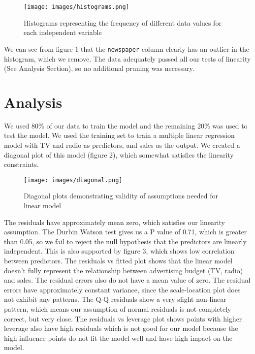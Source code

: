 \documentclass{article}
\begin{document}
\begin{figure}[h]
    \centering
    \texttt{[image: images/histograms.png]}
    \caption{Histograms representing the frequency of different data values for each independent variable}
    \label{fig:enter-label}
\end{figure}

We can see from figure $1$ that the \texttt{newspaper} column clearly has an outlier in the histogram, which we remove.  The data adequately passed all our tests of linearity (See Analysis Section), so no additional pruning was necessary.

\section{Analysis}

We used 80\% of our  data to train the model and the remaining 20\% was used to test the model.  We used the training set to train a multiple linear regression model with TV and radio as predictors, and sales as the output.  We created a diagonal plot of this model (figure 2), which somewhat satisfies the linearity constraints.

\begin{figure}[h]
    \centering
    \texttt{[image: images/diagonal.png]}
    \caption{Diagonal plots demonstrating validity of assumptions needed for linear model}
    \label{fig:enter-label}
\end{figure}

The residuals have approximately mean zero, which satisfies our linearity assumption. The Durbin Watson test gives us a P value of 0.71, which is greater than 0.05, so we fail to reject the null hypothesis that the predictors are linearly independent. This is also supported by figure 3, which shows low correlation between predictors. The residuals vs fitted plot shows that the linear model doesn’t fully represent the relationship between advertising budget (TV, radio) and sales. The residual errors also do not have a mean value of zero. The residual errors have approximately constant variance, since the scale-location plot does not exhibit any patterns.  The Q-Q residuals show a very slight non-linear pattern, which means our assumption of normal residuals is not completely correct, but very close. The residuals vs leverage plot shows points with higher leverage also have high residuals which is not good for our model because the high influence points do not fit the model well and have high impact on the model. 
\end{document}
